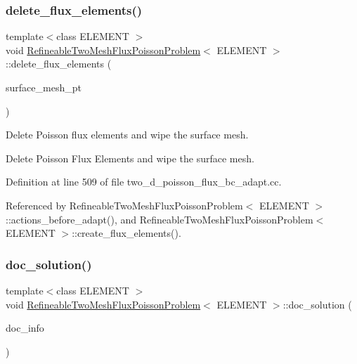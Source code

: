 \subsubsection{\texorpdfstring{delete\+\_\+flux\+\_\+elements()}{delete\_flux\_elements()}}
{\footnotesize\ttfamily template$<$class E\+L\+E\+M\+E\+NT $>$ \\
void \hyperlink{classRefineableTwoMeshFluxPoissonProblem}{Refineable\+Two\+Mesh\+Flux\+Poisson\+Problem}$<$ E\+L\+E\+M\+E\+NT $>$\+::delete\+\_\+flux\+\_\+elements (\begin{DoxyParamCaption}\item[{Mesh $\ast$const \&}]{surface\+\_\+mesh\+\_\+pt }\end{DoxyParamCaption})\hspace{0.3cm}{\ttfamily [private]}}



Delete Poisson flux elements and wipe the surface mesh. 

Delete Poisson Flux Elements and wipe the surface mesh. 

Definition at line 509 of file two\+\_\+d\+\_\+poisson\+\_\+flux\+\_\+bc\+\_\+adapt.\+cc.



Referenced by Refineable\+Two\+Mesh\+Flux\+Poisson\+Problem$<$ E\+L\+E\+M\+E\+N\+T $>$\+::actions\+\_\+before\+\_\+adapt(), and Refineable\+Two\+Mesh\+Flux\+Poisson\+Problem$<$ E\+L\+E\+M\+E\+N\+T $>$\+::create\+\_\+flux\+\_\+elements().

\mbox{\label{classRefineableTwoMeshFluxPoissonProblem_ad9d4a3b5856839fa95f60968fabe3493}} 
\subsubsection{\texorpdfstring{doc\+\_\+solution()}{doc\_solution()}}
{\footnotesize\ttfamily template$<$class E\+L\+E\+M\+E\+NT $>$ \\
void \hyperlink{classRefineableTwoMeshFluxPoissonProblem}{Refineable\+Two\+Mesh\+Flux\+Poisson\+Problem}$<$ E\+L\+E\+M\+E\+NT $>$\+::doc\+\_\+solution (\begin{DoxyParamCaption}\item[{Doc\+Info \&}]{doc\+\_\+info }\end{DoxyParamCaption})}



